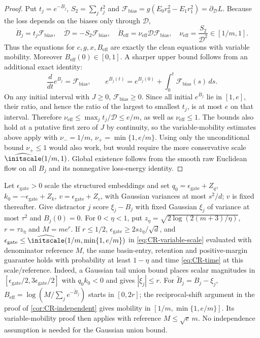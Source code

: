 \begin{proof}
Put $t_j=e^{-B_j}$, $S_2=\sum_jt_j^2$ and
$\mathcal F_{\mathrm{bias}}=g(E_0r_0^2-E_1r_1^2)=\partial_{\mathcal D} L$.
Because the loss depends on the biases only through $\mathcal D$,
\begin{equation}
 \dot B_j=t_j\mathcal F_{\mathrm{bias}},\quad \dot{\mathcal D}=-S_2\mathcal F_{\mathrm{bias}},\quad
 \dot B_{\mathrm{eff}}=\nu_{\mathrm{eff}}\mathcal D\mathcal F_{\mathrm{bias}},\quad
 \nu_{\mathrm{eff}}=\frac{S_2}{\mathcal D^2}\in[1/m,1].
 \label{eq:CR-independent-flow}
\end{equation}
Thus the equations for $c,g,x,B_{\mathrm{eff}}$ are exactly the clean equations with variable mobility.
Moreover $B_{\mathrm{eff}}(0)\in[0,1]$.
A sharper upper bound follows from an additional exact identity:
\[
 \frac{d}{dt}e^{B_j}=\mathcal F_{\mathrm{bias}},\qquad
 e^{B_j(t)}=e^{B_j(0)}+\int_0^t\mathcal F_{\mathrm{bias}}(s)\,ds.
\]
On any initial interval with $J\ge0$, $\mathcal F_{\mathrm{bias}}\ge0$.
Since all initial $e^{B_j}$ lie in $[1,e]$, their ratio, and hence the ratio of the largest to smallest $t_j$, is at most $e$ on that interval.
Therefore $\nu_{\mathrm{eff}}\le\max_jt_j/\mathcal D\le e/m$, as well as $\nu_{\mathrm{eff}}\le1$.
The bounds also hold at a putative first zero of $J$ by continuity, so the variable-mobility estimates above apply with
$\nu_-=1/m$, $\nu_+=\min\{1,e/m\}$.
Using only the unconditional bound $\nu_+\le1$ would also work, but would require the more conservative scale
$\widehat\initscale(1/m,1)$.
Global existence follows from the smooth raw Euclidean flow on all $B_j$ and its nonnegative loss-energy identity.
\end{proof}

\begin{remark}
\label{cor:CR-scalar-Gaussian}
Let $\epsilon_{\mathrm{gate}}>0$ scale the structured embeddings and set
$q_0=\epsilon_{\mathrm{gate}}+Z_q$, $k_0=-\epsilon_{\mathrm{gate}}+Z_k$,
$v=\epsilon_{\mathrm{gate}}+Z_v$, with Gaussian variances at most $s^2/d$;
$v$ is fixed thereafter. Give distractor $j$ score $\xi_j-B_j$ with fixed
Gaussian $\xi_j$ of variance at most $\tau^2$ and $B_j(0)=0$.
For $0<\eta<1$, put $z_\eta=\sqrt{2\log(2(m+3)/\eta)}$,
$r=\tau z_\eta$ and $M=me^r$. If $r\le1/2$,
$\epsilon_{\mathrm{gate}}\ge2sz_\eta/\sqrt d$, and
$\epsilon_{\mathrm{gate}}\le\widehat\initscale(1/m,\min\{1,e/m\})$
in \cref{eq:CR-variable-scale} evaluated with denominator reference $M$,
the same basin-entry, retention and positive-margin guarantee holds with
probability at least $1-\eta$ and time \cref{eq:CR-time} at this scale/reference.
Indeed, a Gaussian tail union bound places scalar magnitudes in
$[\epsilon_{\mathrm{gate}}/2,3\epsilon_{\mathrm{gate}}/2]$ with $q_0k_0<0$
and gives $|\xi_j|\le r$. For $\widetilde B_j=B_j-\xi_j$,
$B_{\mathrm{eff}}=\log(M/\sum_j e^{-\widetilde B_j})$ starts in $[0,2r]$;
the reciprocal-shift argument in the proof of \cref{cor:CR-independent}
gives mobility in $[1/m,\min\{1,e/m\}]$. Its variable-mobility proof then
applies with reference $M\le\sqrt e\,m$. No independence assumption is
needed for the Gaussian union bound.
\end{remark}

